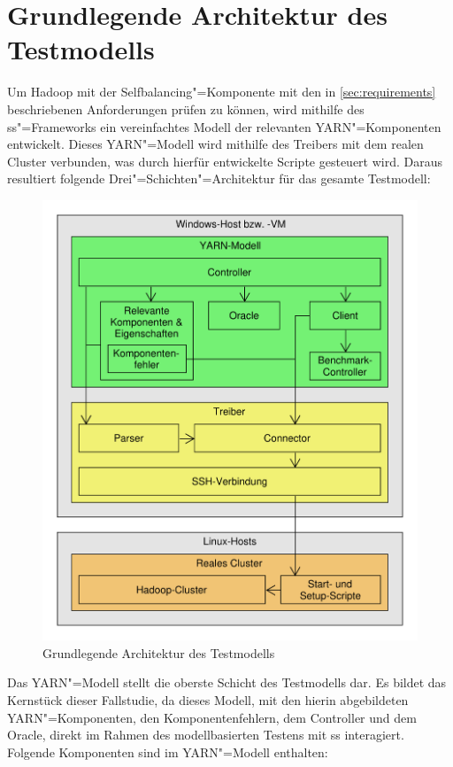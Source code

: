 \section{Grundlegende Architektur des Testmodells}
\label{sec:modelArchitecture}

Um Hadoop mit der Selfbalancing"=Komponente mit den in \cref{sec:requirements} beschriebenen Anforderungen prüfen zu können, wird mithilfe des \gls{ss}"=Frameworks ein vereinfachtes Modell der relevanten YARN"=Komponenten entwickelt.
Dieses YARN"=Modell wird mithilfe des Treibers mit dem realen Cluster verbunden, was durch hierfür entwickelte Scripte gesteuert wird.
Daraus resultiert folgende Drei"=Schichten"=Architektur für das gesamte Testmodell:

\begin{figure}[h]
    \includegraphics[width=0.6\columnwidth]{./resources/modelArchitecture.pdf}
    \caption{Grundlegende Architektur des Testmodells}
    \label{fig:modelArchitecture}
\end{figure}

Das YARN"=Modell stellt die oberste Schicht des Testmodells dar.
Es bildet das Kernstück dieser Fallstudie, da dieses Modell, mit den hierin abgebildeten YARN"=Komponenten, den Komponentenfehlern, dem Controller und dem Oracle, direkt im Rahmen des modellbasierten Testens mit \gls{ss} interagiert.
Folgende Komponenten sind im YARN"=Modell enthalten:

